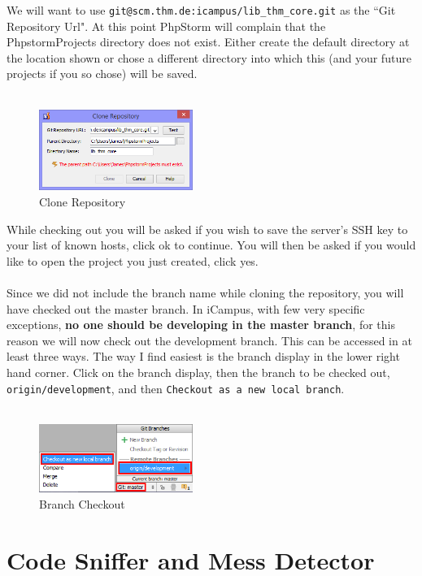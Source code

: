 \documentclass[]{report}
\begin{document}
\noindent
We will want to use \texttt{git@scm.thm.de:icampus/lib\_thm\_core.git} as the ``Git Repository Url". At this point PhpStorm will complain that the PhpstormProjects directory does not exist. Either create the default directory at the location shown or chose a different directory into which this (and your future projects if you so chose) will be saved.\\
\\
\begin{figure}[h] 
	\centering
	\includegraphics[width=5cm]{clonerepositoryerror.png}
	\caption{Clone Repository}
\end{figure}

\noindent
While checking out you will be asked if you wish to save the server's SSH key to your list of known hosts, click ok to continue. You will then be asked if you would like to open the project you just created, click yes.\\
\\
Since we did not include the branch name while cloning the repository, you will have checked out the master branch. In iCampus, with few very specific exceptions, \textbf{no one should be developing in the master branch}, for this reason we will now check out the development branch. This can be accessed in at least three ways. The way I find easiest is the branch display in the lower right hand corner. Click on the branch display, then the branch to be checked out, \texttt{origin/development}, and then \texttt{Checkout as a new local branch}.\\
\\
\begin{figure}[h] 
	\centering
	\includegraphics[width=5cm]{checkoutbranch.png}
	\caption{Branch Checkout}
	\vspace{-15pt}
\end{figure}

\newpage

\section{Code Sniffer and Mess Detector}
\label{sec:qatools}
\end{document}
